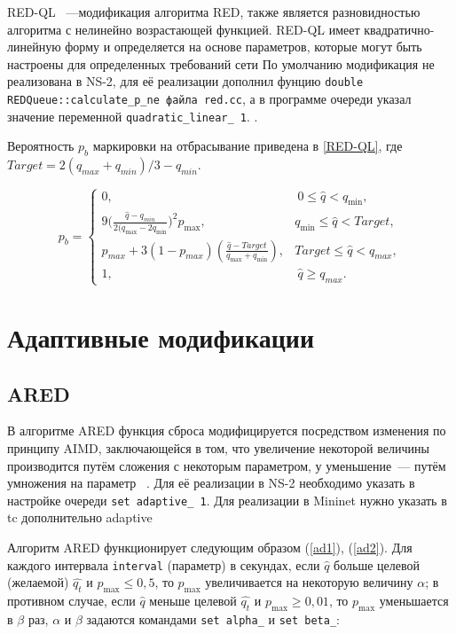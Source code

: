 RED-QL ~---модификация алгоритма RED, также является разновидностью алгоритма с нелинейно возрастающей функцией. RED-QL имеет квадратично-линейную форму и определяется на основе параметров, которые могут быть настроены для определенных требований сети\cite{REDQL} По умолчанию модификация не реализована в NS-2, для её реализации дополнил фунцию \verb|double REDQueue::calculate_p_ne файла red.cc|, а в программе очереди указал значение переменной \verb|quadratic_linear_ 1|. . 

Вероятность $p_{b}$ маркировки на отбрасывание приведена в \eqref{RED-QL}, где $ Target = 2(q_{max} + q_{min})/3 - q_{min} $.

\begin{equation}
\label{RED-QL}
p_{b} = \begin{cases}
        0, &  \ 0 \leqslant \hat{q} < q_{\min},
        \\
        9({\frac{\hat{q} - q_{min}}{2(q_{\max} - 2q_{\min}})^2} {p_{\max}}, &  q_{\min} \leqslant  \hat{q} < {Target},
        \\
        p_{max} + 3(1-p_{max}) (\frac{\hat{q} - Target}{q_{\max} + q_{\min}}), & {Target} \leqslant  \hat{q} < q_{max},
        \\
        1, &  \ \hat{q} \geqslant q_{max}.
\end{cases}
\end{equation}

\section{Адаптивные модификации}
\label{chap2:sec3}

\subsection{ARED}

В алгоритме ARED функция сброса модифицируется
посредством изменения по принципу AIMD, заключающейся в том, что
увеличение некоторой величины производится путём сложения с некоторым
параметром, у уменьшение~--- путём умножения на
параметр ~\cite{ARED}. Для её реализации в NS-2 необходимо указать в
настройке очереди \verb|set adaptive_ 1|. Для реализации в Mininet нужно указать в tc дополнительно adaptive

Алгоритм ARED функционирует следующим образом (\eqref{ad1}),
(\eqref{ad2}). Для каждого интервала \verb|interval| (параметр) в
секундах, если $\hat{q}$ больше целевой (желаемой) $\hat{q_t}$ и
$p_{\max} \leqslant 0,5$, то $p_{\max}$ увеличивается на некоторую
величину $\alpha$; в противном случае, если $\hat{q}$ меньше целевой
$\hat{q_t}$ и $p_{\max}\geqslant 0,01$, то $p_{\max}$ уменьшается в
$\beta$ раз, $\alpha$ и $\beta$ задаются командами \verb|set alpha_| и \verb|set beta_|:

